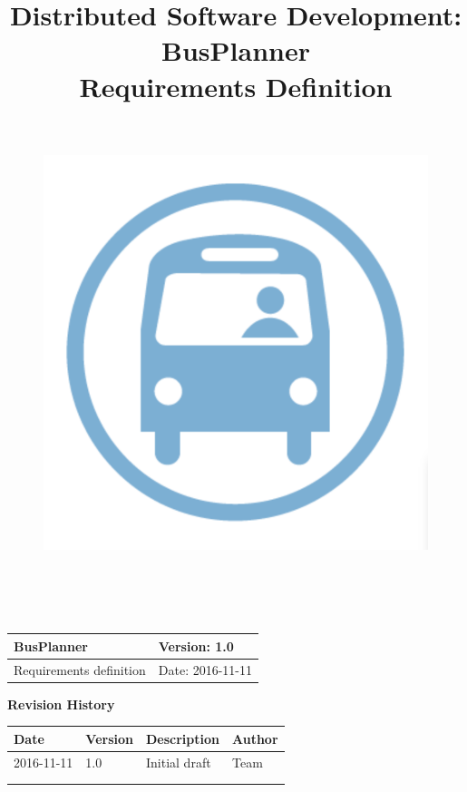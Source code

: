 \documentclass[a4paper, 12pt]{article}
\title{
	\textbf{D}istributed \textbf{S}oftware \textbf{D}evelopment: \textbf{BusPlanner}\\
	\textbf{Requirements Definition}\\
	\begin{figure}[H]
		\centering
		\includegraphics[width=13cm, height=13cm]{Bus_logo}
	\end{figure}
	\date{}
}
\begin{document}
	\begin{table}[t]
		\centering
		\begin{tabular}{| m{6cm} | m{6cm} |}
			\hline
			BusPlanner & Version: 1.0\\
			\hline
			Requirements definition & Date: 2016-11-11\\
			\hline
		\end{tabular}
	\end{table}
	\maketitle 
	\begin{center}
		\textbf{\Large Revision History}
	\end{center}
	\begin{table}[h]
		\centering
		\begin{tabular}{| m{3cm} | m{3cm} | m{3cm} | m{3cm} |}
			\hline
			\textbf{Date} & \textbf{Version} & \textbf{Description} & \textbf{Author}\\
			\hline
			2016-11-11 & 1.0 & Initial draft & Team\\
			\hline
			&&&\\
			\hline
			&&&\\
			\hline
		\end{tabular}
	\end{table}
\newpage
	\tableofcontents
	
	
	
\end{document}
